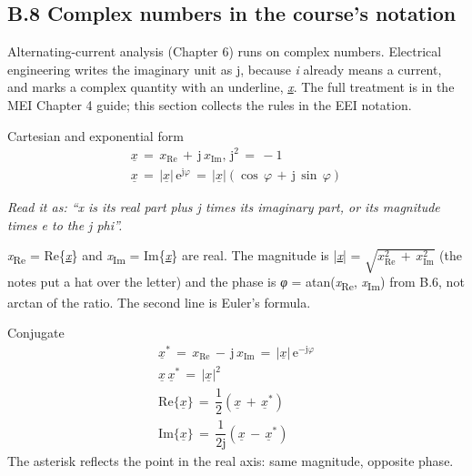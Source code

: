 \documentclass[11pt]{article}
\begin{document}
\begin{keepsection}
\section{B.8 Complex numbers in the course's notation}

Alternating-current analysis (Chapter 6) runs on complex numbers. Electrical engineering writes the imaginary unit as j, because \textit{i} already means a current, and marks a complex quantity with an underline, \underline{\textit{x}}. The full treatment is in the MEI Chapter 4 guide; this section collects the rules in the EEI notation.

\begin{equationcard}{Cartesian and exponential form}
\[ \begin{gathered} \underline{{x}}\, =\, {x}_{\text{Re}}\, +\, \mathrm{j}\, {x}_{\text{Im}},\, \mathrm{j}^{2}\, =\, -1 \\ \underline{{x}}\, =\, |\underline{{x}}|\, \mathrm{e}^{\mathrm{j}{φ}}\, =\, |\underline{{x}}|(\cos \, {φ}\, +\, \mathrm{j}\, \sin \, {φ}) \end{gathered} \]
{\small \emph{Read it as: “x is its real part plus j times its imaginary part, or its magnitude times e to the j phi”.}\par \textit{x}\textsubscript{Re} = Re\{\underline{\textit{x}}\} and \textit{x}\textsubscript{Im} = Im\{\underline{\textit{x}}\} are real. The magnitude is |\underline{\textit{x}}| = \ensuremath{\sqrt{{x}_{\text{Re}}^{2}\, +\, {x}_{\text{Im}}^{2}}} (the notes put a hat over the letter) and the phase is \textit{φ} = atan(\textit{x}\textsubscript{Re}, \textit{x}\textsubscript{Im}) from B.6, not arctan of the ratio. The second line is Euler's formula.}
\end{equationcard}

\begin{equationcard}{Conjugate}
\[ \begin{gathered} \underline{{x}}^{*}\, =\, {x}_{\text{Re}}\, -\, \mathrm{j}\, {x}_{\text{Im}}\, =\, |\underline{{x}}|\, \mathrm{e}^{-\mathrm{j}{φ}} \\ \underline{{x}}\, \underline{{x}}^{*}\, =\, |\underline{{x}}|^{2} \\ \text{Re}\{\underline{{x}}\}\, =\, \dfrac{1}{2}(\underline{{x}}\, +\, \underline{{x}}^{*}) \\ \text{Im}\{\underline{{x}}\}\, =\, \dfrac{1}{2\mathrm{j}}(\underline{{x}}\, -\, \underline{{x}}^{*}) \end{gathered} \]
{\small The asterisk reflects the point in the real axis: same magnitude, opposite phase.}
\end{equationcard}


\end{keepsection}
\end{document}
